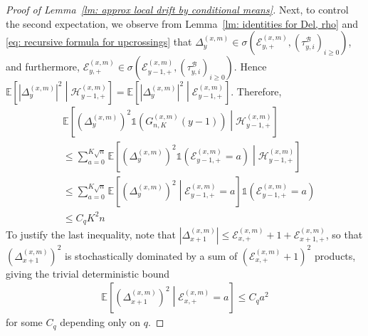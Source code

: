 \documentclass[EJP]{ejpecp} %
\newcommand{\abs}[1]{\left\vert #1 \right\vert}
\begin{document}
\begin{proof}[Proof of Lemma~\ref{lm: approx local drift by conditional means}]
	Next, to control the second expectation, we observe from Lemma~\ref{lm: identities for Del, rho} and \eqref{eq: recursive formula for upcrossings} that $\Delta_y^{(x,m)} \in \sigma \left(\mathcal{E}_{y, +}^{(x,m)}, (\tau_{y,i}^{\mathscr{B}})_{i \ge 0}\right)$, and furthermore, $\mathcal{E}_{y, +}^{(x,m)} \in \sigma \left(\mathcal{E}_{y-1, +}^{(x,m)}, (\tau_{y,i}^{\mathscr{B}})_{i \ge 0}\right)$. Hence $\mathbb{E}\left[|\Delta_y^{(x,m)}|^2 \middle| \mathcal{H}_{y-1, +}^{(x,m)}\right] = \mathbb{E}\left[|\Delta_y^{(x,m)}|^2 \middle| \mathcal{E}_{y-1, +}^{(x,m)}\right]$. Therefore,
	\begin{align*}
		& \mathbb{E}\left[ \left(\Delta_y^{(x,m)}\right)^2 \mathbb{1}\left(G_{n, K}^{(x,m)}(y-1)\right) \middle| \mathcal{H}_{y-1, +}^{(x,m)}  \right] \\
		&\le \sum_{a = 0}^{K \sqrt{n}} \mathbb{E}\left[ \left(\Delta_y^{(x,m)}\right)^2 \mathbb{1}\left( \mathcal{E}_{y-1, +}^{(x,m)} = a \right) \middle| \mathcal{H}_{y-1, +}^{(x,m)} \right] \\
		&\le \sum_{a = 0}^{K \sqrt{n}} \mathbb{E}\left[ \left(\Delta_y^{(x,m)}\right)^2 \middle| \mathcal{E}_{y-1, +}^{(x,m)} = a \right] \mathbb{1}\left( \mathcal{E}_{y-1, +}^{(x,m)} = a \right) \\
		&\le C_q K^2 n
	\end{align*}
	To justify the last inequality, note that $\abs{\Delta_{x+1}^{(x,m)}} \leq  \mathcal{E}_{x,+}^{(x,m)}+1 + \mathcal{E}_{x+1,+}^{(x,m)}$,  
	so that $ \left(\Delta_{x+1}^{(x,m)} \right)^2$ is stochastically dominated by a sum of $\left(\mathcal{E}_{x,+}^{(x,m)}+1\right)^2$ products, giving the trivial deterministic bound
	\begin{align*}
		\mathbb{E}\left[ \left(\Delta_{x+1}^{(x,m)}\right)^2 \middle| \mathcal{E}_{x,+}^{(x,m)} = a  \right]  \leq C_q a^2
	\end{align*}
	for some $C_q$ depending only on $q$.



\end{proof}
\end{document}
